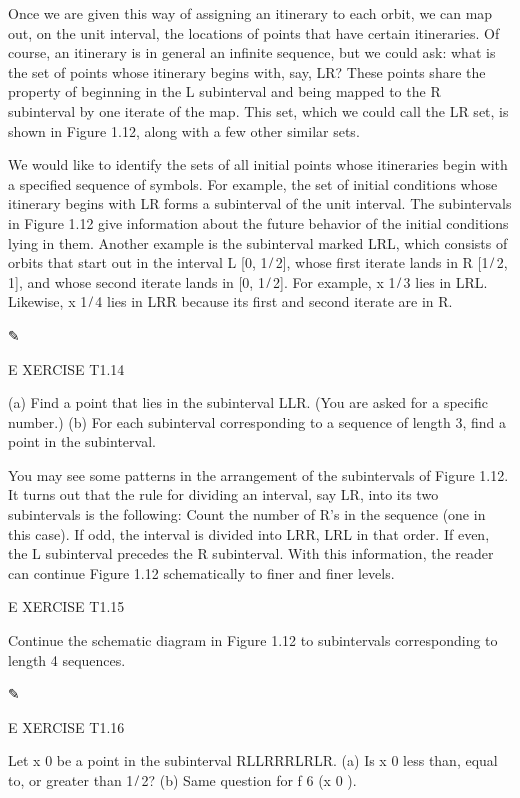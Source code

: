 Once we are given this way of assigning an itinerary to each orbit, we can map out, on the unit interval, 
the locations of points that have certain itineraries. Of course, an itinerary is in general an inﬁnite 
sequence, but we could ask: what is the set of points whose itinerary begins with, say, LR? These points 
share the property of beginning in the L subinterval and being mapped to the R subinterval by one iterate 
of the map. This set, which we could call the LR set, is shown in Figure 1.12, along with a few other 
similar sets.

We would like to identify the sets of all initial points whose itineraries begin with a speciﬁed sequence 
of symbols. For example, the set of initial conditions whose itinerary begins with LR forms a subinterval 
of the unit interval. The subintervals in Figure 1.12 give information about the future behavior of the 
initial conditions lying in them. Another example is the subinterval marked LRL, which consists of orbits 
that start out in the interval L  [0, 1 ̸ 2], whose ﬁrst iterate lands in R  [1 ̸ 2, 1], and whose second 
iterate lands in [0, 1 ̸ 2]. For example, x  1 ̸ 3 lies in LRL. Likewise, x  1 ̸ 4 lies in LRR because its 
ﬁrst and second iterate are in R.

✎

E XERCISE T1.14

(a) Find a point that lies in the subinterval LLR. (You are asked for a speciﬁc number.) (b) For each 
subinterval corresponding to a sequence of length 3, ﬁnd a point in the subinterval.

You may see some patterns in the arrangement of the subintervals of Figure 1.12. It turns out that the rule 
for dividing an interval, say LR, into its two subintervals is the following: Count the number of R’s in 
the sequence (one in this case). If odd, the interval is divided into LRR, LRL in that order. If even, the 
L subinterval precedes the R subinterval. With this information, the reader can continue Figure 1.12 
schematically to ﬁner and ﬁner levels.

E XERCISE T1.15

Continue the schematic diagram in Figure 1.12 to subintervals corresponding to length 4 sequences.

✎

E XERCISE T1.16

Let x 0 be a point in the subinterval RLLRRRLRLR. (a) Is x 0 less than, equal to, or greater than 1 ̸ 2? (b) 
Same question for f 6 (x 0 ).

